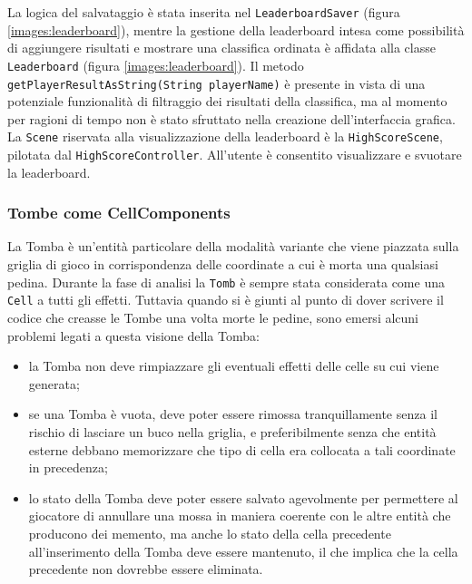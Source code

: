 \documentclass[a4paper,12pt]{report}
\begin{document}
La logica del salvataggio è stata inserita nel \texttt{LeaderboardSaver} (figura \ref{images:leaderboard}), mentre la gestione della leaderboard intesa come possibilità di aggiungere risultati e mostrare una classifica ordinata è affidata alla classe \texttt{Leaderboard} (figura \ref{images:leaderboard}). Il metodo \texttt{getPlayerResultAsString(String playerName)} è presente in vista di una potenziale funzionalità di filtraggio dei risultati della classifica, ma al momento per ragioni di tempo non è stato sfruttato nella creazione dell'interfaccia grafica. La \texttt{Scene} riservata alla visualizzazione della leaderboard è la \texttt{HighScoreScene}, pilotata dal \texttt{HighScoreController}. All'utente è consentito visualizzare e svuotare la leaderboard.

\subsubsection{Tombe come CellComponents}

La Tomba è un'entità particolare della modalità variante che viene piazzata sulla griglia di gioco in corrispondenza delle coordinate a cui è morta una qualsiasi pedina. Durante la fase di analisi la \texttt{Tomb} è sempre stata considerata come una \texttt{Cell} a tutti gli effetti. Tuttavia quando si è giunti al punto di dover scrivere il codice che creasse le Tombe una volta morte le pedine, sono emersi alcuni problemi legati a questa visione della Tomba:
\begin{itemize}
	\item la Tomba non deve rimpiazzare gli eventuali effetti delle celle su cui viene generata;
	\item se una Tomba è vuota, deve poter essere rimossa tranquillamente senza il rischio di lasciare un buco nella griglia, e preferibilmente senza che entità esterne debbano memorizzare che tipo di cella era collocata a tali coordinate in precedenza;
	\item lo stato della Tomba deve poter essere salvato agevolmente per permettere al giocatore di annullare una mossa in maniera coerente con le altre entità che producono dei memento, ma anche lo stato della cella precedente all'inserimento della Tomba deve essere mantenuto, il che implica che la cella precedente non dovrebbe essere eliminata.
\end{itemize}
\end{document}
